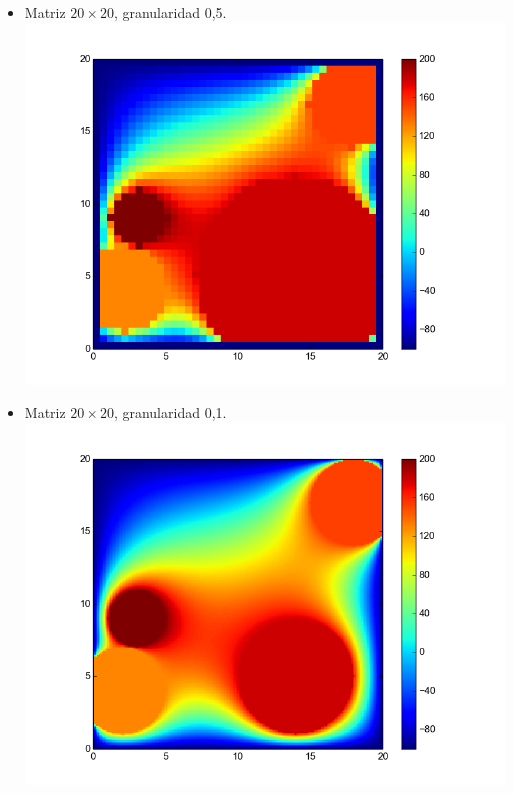 \begin{itemize}
 \item Matriz $20 \times 20$, granularidad 0,5.\\
  \includegraphics[width=400pt]{imagenes/imagen31.png}
  
   \item Matriz $20 \times 20$, granularidad 0,1.\\
  \includegraphics[width=400pt]{imagenes/imagen41.png}
\end{itemize}